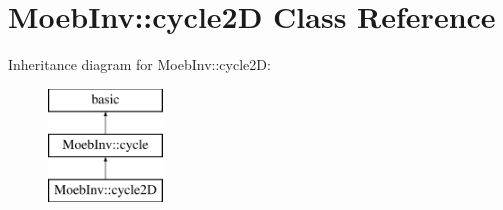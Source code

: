 \hypertarget{class_moeb_inv_1_1cycle2_d}{}\section{Moeb\+Inv\+:\+:cycle2D Class Reference}
\label{class_moeb_inv_1_1cycle2_d}
Inheritance diagram for Moeb\+Inv\+:\+:cycle2D\+:\begin{figure}[H]
\begin{center}
\leavevmode
\includegraphics[height=3.000000cm]{class_moeb_inv_1_1cycle2_d}
\end{center}
\end{figure}
